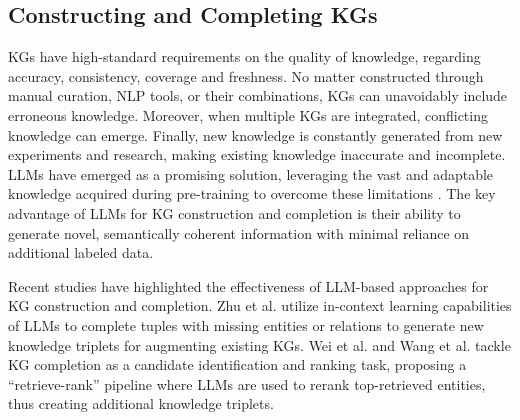 \subsection{Constructing and Completing KGs}
KGs have high-standard requirements on the quality of knowledge, regarding accuracy, consistency, coverage and freshness. No matter constructed through manual curation, NLP tools, or their combinations, KGs can unavoidably include erroneous knowledge. Moreover, when multiple KGs are integrated, conflicting knowledge can emerge. Finally, new knowledge is constantly generated from new experiments and research, making existing knowledge inaccurate and incomplete. LLMs have emerged as a promising solution, leveraging the vast and adaptable knowledge acquired during pre-training to overcome these limitations \cite{petroni2019language, yu2024kola, xu2024clingen, alkhamissi2022review}. 
The key advantage of LLMs for KG construction and completion is their ability to generate novel, semantically coherent information with minimal reliance on additional labeled data.


Recent studies have highlighted the effectiveness of LLM-based approaches for KG construction and completion. Zhu et al. \citep{zhu2023llms} utilize in-context learning capabilities of LLMs to complete tuples with missing entities or relations to generate new knowledge triplets for augmenting existing KGs.
Wei et al. \citep{wei-etal-2023-kicgpt} and Wang et al. \citep{wang-etal-2024-kc} tackle KG completion as a candidate identification and ranking task, proposing a “retrieve-rank” pipeline where LLMs are used to rerank top-retrieved entities, thus creating additional knowledge triplets.

